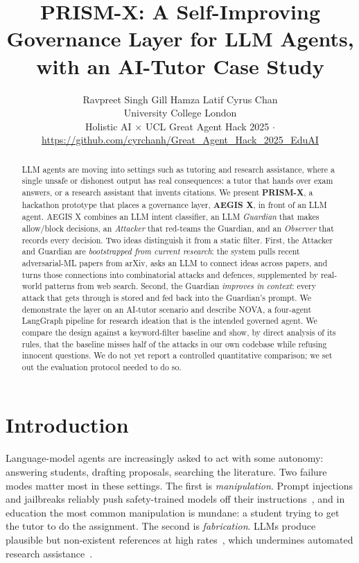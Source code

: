 \documentclass[10pt,twocolumn]{article}
\title{\vspace{-1.2em}\textbf{PRISM-X: A Self-Improving Governance Layer for LLM Agents,\\with an AI-Tutor Case Study}}
\author{Ravpreet Singh Gill \quad Hamza Latif \quad Cyrus Chan\\[2pt]
\normalsize University College London\\[2pt]
\small Holistic AI $\times$ UCL Great Agent Hack 2025 \;$\cdot$\; \url{https://github.com/cyrchanh/Great_Agent_Hack_2025_EduAI}}
\date{\vspace{-2.2em}}
\begin{document}
\maketitle

\begin{abstract}
\noindent
LLM agents are moving into settings such as tutoring and research assistance, where a single unsafe or dishonest output has real consequences: a tutor that hands over exam answers, or a research assistant that invents citations. We present \textbf{PRISM-X}, a hackathon prototype that places a governance layer, \textbf{AEGIS X}, in front of an LLM agent. AEGIS X combines an LLM intent classifier, an LLM \emph{Guardian} that makes allow/block decisions, an \emph{Attacker} that red-teams the Guardian, and an \emph{Observer} that records every decision. Two ideas distinguish it from a static filter. First, the Attacker and Guardian are \emph{bootstrapped from current research}: the system pulls recent adversarial-ML papers from arXiv, asks an LLM to connect ideas across papers, and turns those connections into combinatorial attacks and defences, supplemented by real-world patterns from web search. Second, the Guardian \emph{improves in context}: every attack that gets through is stored and fed back into the Guardian's prompt. We demonstrate the layer on an AI-tutor scenario and describe NOVA, a four-agent LangGraph pipeline for research ideation that is the intended governed agent. We compare the design against a keyword-filter baseline and show, by direct analysis of its rules, that the baseline misses half of the attacks in our own codebase while refusing innocent questions. We do not yet report a controlled quantitative comparison; we set out the evaluation protocol needed to do so.
\end{abstract}

\section{Introduction}
Language-model agents are increasingly asked to act with some autonomy: answering students, drafting proposals, searching the literature. Two failure modes matter most in these settings. The first is \emph{manipulation}. Prompt injections and jailbreaks reliably push safety-trained models off their instructions~\cite{wei2023jailbroken,zou2023universal,greshake2023indirect}, and in education the most common manipulation is mundane: a student trying to get the tutor to do the assignment. The second is \emph{fabrication}. LLMs produce plausible but non-existent references at high rates~\cite{walters2023fabrication}, which undermines automated research assistance~\cite{lu2024aiscientist,si2024novel}.
\end{document}
